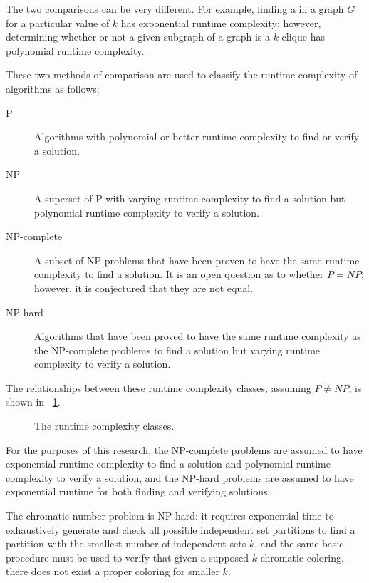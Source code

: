 The two comparisons can be very different.  For example, finding a  in a graph \(G\) for a particular value
of \(k\) has exponential runtime complexity; however, determining whether or not a given subgraph of a graph is a
\(k\)-clique has polynomial runtime complexity.

These two methods of comparison are used to classify the runtime complexity of algorithms as follows:
\begin{description}
\item[P] Algorithms with polynomial or better runtime complexity to find or verify a solution.
\item[NP] A superset of P with varying runtime complexity to find a solution but polynomial runtime complexity to
  verify a solution.
\item[NP-complete] A subset of NP problems that have been proven to have the same runtime complexity to find a
  solution.  It is an open question as to whether \(P=NP\); however, it is conjectured that they are not equal.
\item[NP-hard] Algorithms that have been proved to have the same runtime complexity as the NP-complete problems to
  find a solution but varying runtime complexity to verify a solution.
\end{description}

The relationships between these runtime complexity classes, assuming \(P\ne NP\), is shown in
\figurename~\ref{fig:complexity}.

\begin{figure}[H]
  \centering
  \caption{The runtime complexity classes.}
  \label{fig:complexity}
\end{figure}

For the purposes of this research, the NP-complete problems are assumed to have exponential runtime complexity to
find a solution and polynomial runtime complexity to verify a solution, and the NP-hard problems are assumed to
have exponential runtime for both finding and verifying solutions.

The chromatic number problem is NP-hard: it requires exponential time to exhaustively generate and check all
possible independent set partitions to find a partition with the smallest number of independent sets \(k\), and the
same basic procedure must be used to verify that given a supposed \(k\)-chromatic coloring, there does not exist a
proper coloring for smaller \(k\).

